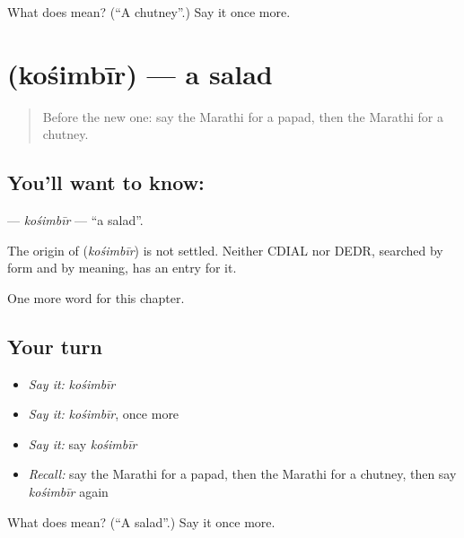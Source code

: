 \begin{tcolorbox}[breakable,colback=teal!4,colframe=teal!35!black,title={Before you move on}]
What does  mean? (\textquotedblleft{}A chutney\textquotedblright{}.) Say it once more.
\end{tcolorbox}
\section[\texorpdfstring{\mr{कोशिंबीर} (kośimbīr)}{कोशिंबीर (kośimbīr)}]{ (kośimbīr) — a salad}

\label{lesson:MR-C186-kosimbir}



\begin{quote}
Before the new one: say the Marathi for a papad, then the Marathi for a chutney.
\end{quote}

\subsection*{You'll want to know: }
\textbf{} — \emph{kośimbīr} — \textquotedblleft{}a salad\textquotedblright{}.

\begin{cousinweb}
The origin of \textbf{} (\emph{kośimbīr}) is not settled. Neither CDIAL nor DEDR, searched by form and by meaning, has an entry for it.
\end{cousinweb}

\begin{grammarlens}[title={What you've built}]
One more word for this chapter.
\end{grammarlens}

\subsection*{Your turn}
\begin{itemize}
\raggedright
  \item \emph{Say it:} \emph{kośimbīr}
  \item \emph{Say it:} \emph{kośimbīr}, once more
  \item \emph{Say it:} say \emph{kośimbīr}
  \item \emph{Recall:} say the Marathi for a papad, then the Marathi for a chutney, then say \emph{kośimbīr} again
\end{itemize}

\begin{tcolorbox}[breakable,colback=teal!4,colframe=teal!35!black,title={Before you move on}]
What does  mean? (\textquotedblleft{}A salad\textquotedblright{}.) Say it once more.
\end{tcolorbox}
